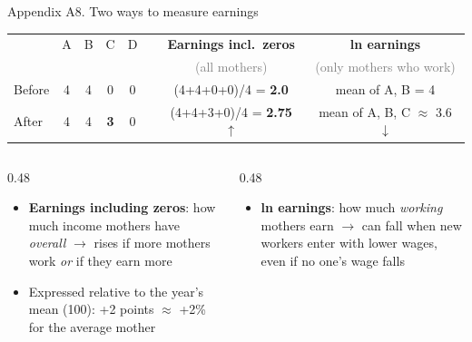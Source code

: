 \documentclass[aspectratio=169,10pt]{beamer}
\newcommand{\takeaway}[1]{\par\vspace{6pt}{\small\textcolor{steel}{$\Rightarrow$}\ \textbf{\textcolor{navy}{#1}}}}
\begin{document}
\begin{frame}{Appendix A8. Two ways to measure earnings}
\vspace{4pt}
\begin{center}
\footnotesize
\renewcommand{\arraystretch}{1.2}
\begin{tabular}{@{}lccccc|c|c@{}}
\toprule
 & A & B & C & D & & \textbf{Earnings incl.\ zeros} & \textbf{ln earnings} \\
 & & & & & & \textcolor{graytext}{(all mothers)} & \textcolor{graytext}{(only mothers who work)} \\
\midrule
Before & 4 & 4 & 0 & 0 & & (4+4+0+0)/4 = \textbf{2.0} & mean of A, B = 4 \\
After & 4 & 4 & \textbf{3} & 0 & & (4+4+3+0)/4 = \textbf{2.75} $\uparrow$ & mean of A, B, C $\approx$ 3.6 $\downarrow$ \\
\bottomrule
\end{tabular}
\end{center}
\vspace{4pt}
\begin{columns}[T]
\begin{column}{0.48\textwidth}
\begin{itemize}
  \footnotesize
  \item \textbf{Earnings including zeros}: how much income mothers have \emph{overall} $\to$ rises if more mothers work \emph{or} if they earn more
  \item Expressed relative to the year's mean (100): +2 points $\approx$ +2\% for the average mother
\end{itemize}
\end{column}
\begin{column}{0.48\textwidth}
\begin{itemize}
  \footnotesize
  \item \textbf{ln earnings}: how much \emph{working} mothers earn $\to$ can fall when new workers enter with lower wages, even if no one's wage falls
\end{itemize}
\end{column}
\end{columns}
\takeaway{Earnings including zeros capture new workers; ln earnings only captures wages.}
\end{frame}
\end{document}
